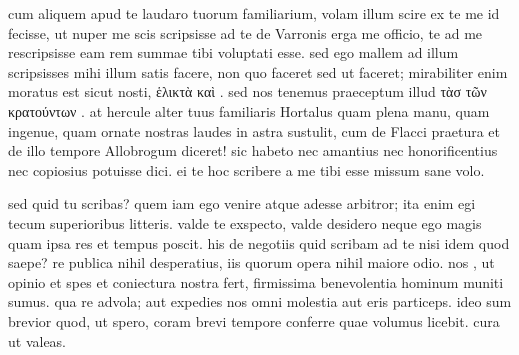 


 cum aliquem apud te laudaro tuorum familiarium, volam illum scire ex te me id fecisse, ut nuper me scis scripsisse ad te de Varronis erga me officio, te ad me rescripsisse eam rem summae tibi voluptati esse. sed ego mallem ad illum scripsisses mihi illum satis facere, non quo faceret sed ut faceret; mirabiliter enim moratus est sicut nosti, ἑλικτὰ καὶ . sed nos tenemus praeceptum illud τὰσ τῶν κρατούντων . at hercule alter tuus familiaris Hortalus quam plena manu, quam ingenue, quam ornate nostras laudes in astra sustulit, cum de Flacci praetura et de illo tempore Allobrogum diceret! sic habeto nec amantius nec honorificentius nec copiosius potuisse dici. ei te hoc scribere a me tibi esse missum sane volo.

 sed quid tu scribas? quem iam ego venire atque adesse arbitror; ita enim egi tecum superioribus litteris. valde te exspecto, valde desidero neque ego magis quam ipsa res et tempus poscit. his de negotiis quid scribam ad te nisi idem quod saepe? re publica nihil desperatius, iis quorum opera nihil maiore odio. nos , ut opinio et spes et coniectura nostra fert, firmissima benevolentia hominum muniti sumus. qua re advola; aut expedies nos omni molestia aut eris particeps. ideo sum brevior quod, ut spero, coram brevi tempore conferre quae volumus licebit. cura ut valeas.
